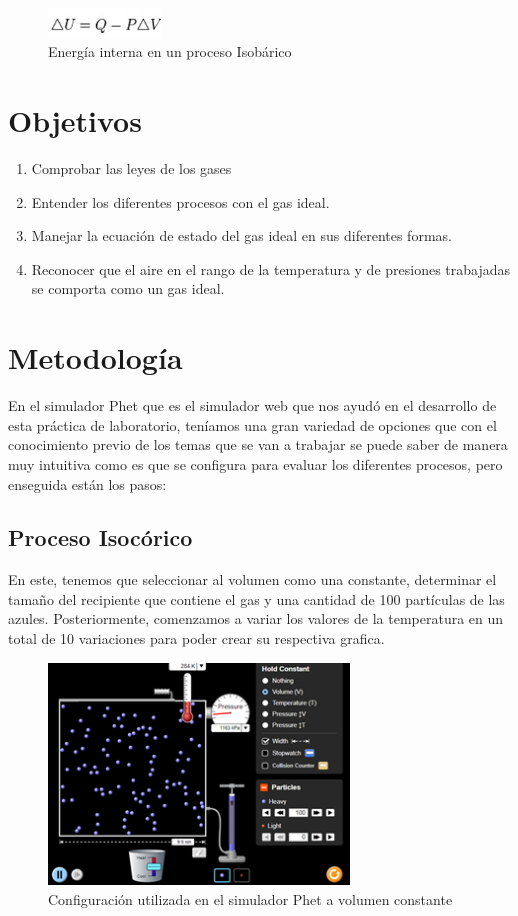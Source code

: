 \documentclass[journal,transmag]{IEEEtran}
\begin{document}
\begin{figure}[!h]
				\center
				\includegraphics[width=3cm]{img/8.jpeg}
				\caption{Energía interna en un proceso Isobárico}
				\label{f8}
	\end{figure}
\section{Objetivos}

	\begin{enumerate}
		\item Comprobar las leyes de los gases 
		\item Entender los diferentes procesos con el gas ideal.
		\item Manejar la ecuación de estado del gas ideal en sus diferentes formas.
		\item Reconocer que el aire en el rango de la temperatura y de presiones trabajadas se comporta como un gas ideal.
	\end{enumerate}
	

\section{Metodología}

En el simulador Phet que es el simulador web que nos ayudó en el desarrollo de esta práctica de laboratorio, teníamos una gran variedad de opciones que con el conocimiento previo de los temas que se van a trabajar se puede saber de manera muy intuitiva como es que se configura para evaluar los diferentes procesos, pero enseguida están los pasos:  

\subsection{\textbf{Proceso Isocórico }}
En este, tenemos que seleccionar al volumen como una constante, determinar el tamaño del recipiente que contiene el gas y una cantidad de 100 partículas de las azules. Posteriormente, comenzamos a variar los valores de la temperatura en un total de 10 variaciones para poder crear su respectiva grafica. 

\begin{figure}[!h]
				\center
				\includegraphics[width=8cm]{img/isoco.png}
				\caption{Configuración utilizada en el simulador Phet a volumen constante}
				\label{f9}
	\end{figure}
\end{document}
